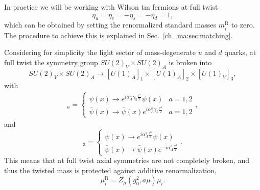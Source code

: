 In practice we will be working with Wilson tm fermions at full twist
\begin{equation}
\eta_u=\eta_c=-\eta_s=-\eta_d=1,
\end{equation}
which can be obtained by setting the renormalized standard masses $m_i^{\textrm{R}}$ to zero. The procedure to achieve this is explained in Sec.~\ref{ch_ma:sec:matching}.

Considering for simplicity the light sector of mass-degenerate $u$ and $d$ quarks, at full twist the symmetry group $SU(2)_V\times SU(2)_A$ is broken into
\begin{equation}
SU(2)_V\times SU(2)_A\rightarrow[U(1)_A]_1\times[U(1)_A]_2\times[U(1)_V]_3,
\end{equation}
with 
\begin{align}
[U(1)_A]_a=\left\{\begin{matrix}
\psi(x)\rightarrow e^{i\alpha_A^a\gamma_5\frac{\tau^a}{2}}\psi(x) & a=1,2 \\ 
\bar{\psi}(x)\rightarrow \bar{\psi}(x)e^{i\alpha_A^a\gamma_5\frac{\tau^a}{2}} & a=1,2
\end{matrix}\right.,
\end{align}
and
\begin{equation}
[U(1)_V]_3=\left\{\begin{matrix}
\psi(x)\rightarrow e^{i\alpha_A^3\frac{\tau^3}{2}}\psi(x) \\ 
\bar{\psi}(x)\rightarrow \bar{\psi}(x)e^{-i\alpha_A^3\frac{\tau^3}{2}}
\end{matrix}\right..
\end{equation}
This means that at full twist axial symmetries are not completely broken, and thus the twisted mass is protected against additive renormalization,
\begin{equation}
\label{ch_foundation:eq:muR}
\mu_i^{\textrm{R}}=Z_{\mu}(g_0^2,a\mu)\mu_i.
\end{equation}


